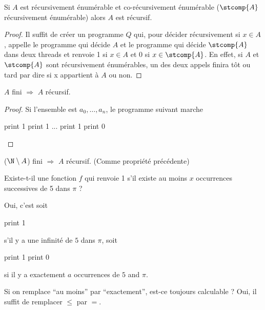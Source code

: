 \begin{myprop}
    Si $A$ est récursivement énumérable et co-récursivement énumérable ($\stcomp{A}$ récursivement énumérable)
    alors $A$ est récursif.
    \begin{proof}
      Il suffit de créer un programme $Q$ qui, pour décider récursivement si $x \in A$, appelle le programme qui décide $A$ et le programme qui décide $\stcomp{A}$ dans deux threads et renvoie 1 si $x \in A$ et 0 si $x \in \stcomp{A}$. En effet, si $A$ et $\stcomp{A}$ sont récursivement énumérables, un des deux appels finira tôt ou tard par dire si x appartient à $A$ ou non.
    \end{proof}
\end{myprop}

\begin{myprop}
	$A$ fini $\Rightarrow$ $A$ récursif.
    \begin{proof}
      Si l'ensemble est $a_0, \ldots, a_n$, le programme suivant marche
      \begin{algorithmic}
        \STATE print 1
        \STATE print 1
        \STATE ...
        \STATE print 1
        \ELSE
        \STATE print 0
        \ENDIF
      \end{algorithmic}
    \end{proof}
\end{myprop}

\begin{myprop}
	($\N \setminus A$) fini $\Rightarrow$ $A$ récursif. (Comme propriété précédente)
\end{myprop}

\begin{myexem}
  Existe-t-il une fonction $f$ qui renvoie 1 s'il existe au moins $x$ occurrences successives de 5 dans $\pi$ ?

  Oui, c'est soit
  \begin{algorithmic}
    \STATE print 1
  \end{algorithmic}
  s'il y a une infinité de $5$ dans $\pi$,
  soit
  \begin{algorithmic}
    \STATE print 1
    \ELSE
    \STATE print 0
    \ENDIF
  \end{algorithmic}
  si il y a exactement $a$ occurrences de $5$ and $\pi$.

  Si on remplace ``au moins'' par ``exactement'', est-ce toujours calculable ?
  Oui, il suffit de remplacer $\leq$ par $=$.
\end{myexem}

